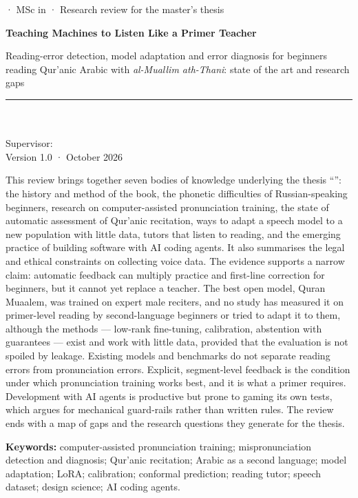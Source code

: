 \documentclass[a4paper,14pt]{extarticle}
\begin{document}
\thispagestyle{plain}
\begin{center}
{\headfamily\small\color{textmuted}\thesisUniversityEn{} · MSc in \thesisSpecialtyEn{} · Research review for the master's thesis}\\[10pt]
{\headfamily\LARGE\bfseries\color{textaccent}Teaching Machines to Listen Like a Primer Teacher\par}
\vspace{4pt}
{\headfamily\large\color{textaccent}Reading-error detection, model adaptation and error diagnosis for beginners reading Qur'anic Arabic with \emph{al-Muallim ath-Thani}: state of the art and research gaps\par}
\vspace{10pt}
{\color{textrule}\rule{0.35\linewidth}{1pt}}\\[8pt]
{\large \thesisAuthorEn}\\[2pt]
{\small Supervisor: \thesisSupervisorEn}\\[2pt]
{\small\color{textmuted} Version 1.0 · October 2026}
\end{center}

\begin{keybox}[Abstract]
This review brings together seven bodies of knowledge underlying the thesis ``\thesisTopicEn'': the history and method of the book, the phonetic difficulties of
Russian-speaking beginners, research on computer-assisted pronunciation training, the state of automatic
assessment of Qur'anic recitation, ways to adapt a speech model to a new population with little data,
tutors that listen to reading, and the emerging practice of building
software with AI coding agents.
It also summarises the legal and ethical constraints on collecting voice data. The evidence supports a
narrow claim: automatic feedback can multiply practice and first-line correction for beginners, but it
cannot yet replace a teacher. The best open model, Quran Muaalem, was trained on expert male reciters, and
no study has measured it on primer-level reading by second-language beginners or tried to adapt it to
them, although the methods --- low-rank fine-tuning, calibration, abstention with guarantees --- exist and
work with little data, provided that the evaluation is not spoiled by leakage. Existing models and benchmarks do not separate reading errors from pronunciation errors. Explicit,
segment-level feedback is the condition under which pronunciation training works best, and it is what a
primer requires. Development with AI agents is productive but prone to gaming its own tests, which argues
for mechanical guard-rails rather than written rules. The review ends with a map of gaps and the research
questions they generate for the thesis.

\smallskip
\textbf{Keywords:} computer-assisted pronunciation training; mispronunciation detection and diagnosis;
Qur'anic recitation; Arabic as a second language; model adaptation; LoRA; calibration; conformal prediction; reading tutor; speech dataset; design science; AI coding agents.
\end{keybox}
\end{document}
